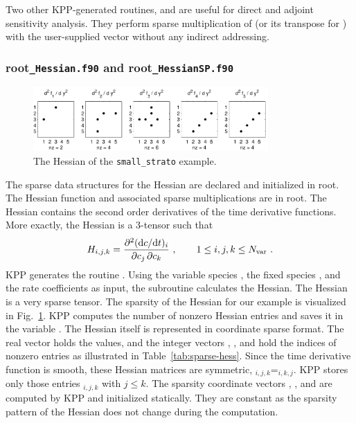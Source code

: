 \documentclass[twoside]{article}
\newcommand{\kpproot}{{\sc root}}
\begin{document}
Two other KPP-generated routines,  and
 are useful for direct and adjoint sensitivity
analysis. They perform sparse multiplication of  (or its
transpose for ) with the user-supplied vector
 without any indirect addressing.

\subsubsection{\kpproot{\tt\_Hessian.f90} and \kpproot{\tt\_HessianSP.f90}}
\label{sec:output-ode-hess}

\begin{figure}[htbp]
  \centering \includegraphics[width=0.8\textwidth]{Figures/small_hess1}
  \caption{The Hessian of the {\tt small\_strato} example.}
  \label{fig:hess1}
\end{figure}

The sparse data structures for the Hessian are declared and initialized
in \kpproot{}. The Hessian function and associated
sparse multiplications are in \kpproot{}. The Hessian
contains the second order derivatives of the time derivative functions.
More exactly, the Hessian is a 3-tensor such that
%
\begin{equation}
H_{i,j,k} = \frac{\partial^2 ({\mathrm{d}} c/{\mathrm{d}} t)_i}{\partial c_j \,\partial c_k}~,
  \qquad 1 \le i,j,k \le N_{\rm var}~.
\label{eqn:Hessian1}
\end{equation}
%
KPP generates the routine . Using the variable species
, the fixed species , and the rate coefficients
 as input, the subroutine calculates the Hessian. The Hessian
is a very sparse tensor. The sparsity of the Hessian for our
 example is visualized in Fig.~\ref{fig:hess1}. KPP
computes the number of nonzero Hessian entries and saves it in the
variable . The Hessian itself is represented in coordinate
sparse format. The real vector  holds the values, and the
integer vectors , , and  hold
the indices of nonzero entries as illustrated in
Table~\ref{tab:sparse-hess}. Since the time derivative function is
smooth, these Hessian matrices are symmetric,
$_{i,j,k}$=$_{i,k,j}$. KPP stores only those
entries $_{i,j,k}$ with $j \le k$. The sparsity coordinate
vectors , , and  are computed
by KPP and initialized statically. They are constant as the sparsity
pattern of the Hessian does not change during the computation.
\end{document}
